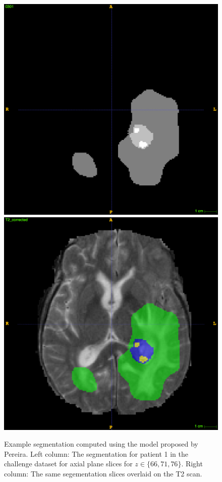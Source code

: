 \documentclass[12pt,a4paper,twoside,openright]{report}
\begin{document}
\begin{figure}
	\\
	\vspace{0.5cm}
	\includegraphics[scale = 0.1]{challenge_1_segmentation_76}
	\includegraphics[scale = 0.1]{challenge_1_segmentation_with_T2_76}
	
	\caption[Example segmentation computed using the model proposed by Pereira.]{Example segmentation computed using the model proposed by Pereira. Left column: The segmentation for patient 1 in the challenge dataset for axial plane slices for $z \in \{66, 71, 76\}$. Right column: The same segementation slices overlaid on the T2 scan.}
	\label{fig:example_pereira_segmentation}
\end{figure}
\end{document}
